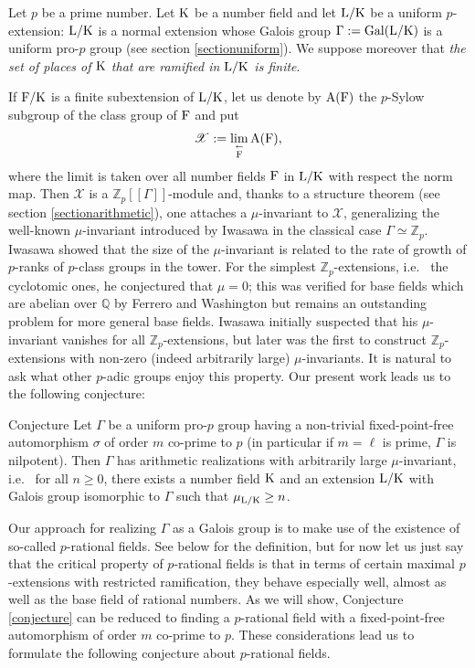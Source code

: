 \documentclass[12pt,a4paper,twoside,english]{smfart}
\def\K{{\rm K}}
\def\L{{\rm L}}
\def\F{{\rm F}}
\def\Q{{\mathbb Q}}
\def\Z{{\mathbb Z}}
\def\X{{\mathcal X}}
\def\Gal{{\rm Gal}}
\def\A{{\rm A}}
\newenvironment{conjecture}{\begin{enonce}{Conjecture}}{\end{enonce}}
\begin{document}
Let $p$ be a prime number.
 Let $\K$ be a number field and let $\L/\K$ be a uniform $p$-extension: $\L/\K$ is a normal extension whose Galois group $\Gamma:=\Gal(\L/\K)$  is a uniform pro-$p$ group (see section \ref{sectionuniform}). 
We suppose moreover  that \emph{the set of places of $\K$  that are ramified in $\L/\K$ is finite}. 
 
 \medskip
 
 If $\F/\K$ is a finite subextension of $\L/\K$, let us denote by $\A(\F)$ the $p$-Sylow subgroup of the class group of $\F$ and put $$\X:=\lim_{\stackrel{\leftarrow}{\F}} \A(\F),$$
where the limit is taken over all number fields $\F$ in $\L/\K$ with respect the norm map.
Then $\X$ is a $\Z_p[[\Gamma]]$-module and, thanks to a structure theorem (see section \ref{sectionarithmetic}), one attaches a $\mu$-invariant to $\X$, generalizing the well-known $\mu$-invariant introduced by Iwasawa in the classical case  $\Gamma\simeq \Z_p$.  Iwasawa showed that the size of the $\mu$-invariant is related to the rate of growth of $p$-ranks of $p$-class groups in the tower.  For the simplest $\Z_p$-extensions, i.e.~ the cyclotomic ones, he conjectured that $\mu=0$; this was verified for base fields which are abelian over $\Q$ by Ferrero and Washington \cite{FW} but remains an outstanding problem for more general base fields.
Iwasawa initially suspected that his
$\mu$-invariant vanishes for all $\Z_p$-extensions, but later was the first to construct $\Z_p$-extensions with non-zero (indeed arbitrarily large) $\mu$-invariants.  It is natural to ask what other
$p$-adic groups enjoy this property.
Our present work leads us to the following conjecture:

\begin{conjecture}\label{conjecture} Let $\Gamma$ be a uniform pro-$p$ group having a non-trivial fixed-point-free automorphism $\sigma$ of order $m$ co-prime to $p$ (in particular if $m=\ell$ is prime, $\Gamma$ is nilpotent). Then $\Gamma$
has arithmetic realizations with arbitrarily large $\mu$-invariant, i.e.~ for all $n\geq 0$, there exists a number field $\K$ and an extension $\L/\K$ with Galois group isomorphic to $\Gamma$ such that $\mu_{\L/\K} \geq n$. 
\end{conjecture}



Our approach for realizing $\Gamma$ as a Galois group is to make use of the existence of so-called $p$-rational fields.
See below for the definition, but for now let us just say that the critical property of $p$-rational fields is that in terms of certain maximal $p$-extensions with restricted ramification, they behave especially well, almost as well as the base field of rational numbers.
As we will show, Conjecture \ref{conjecture} can be reduced to finding a  $p$-rational field with a fixed-point-free automorphism of order $m$ co-prime to $p$.  These considerations lead us to formulate the following conjecture about $p$-rational fields.
\end{document}
